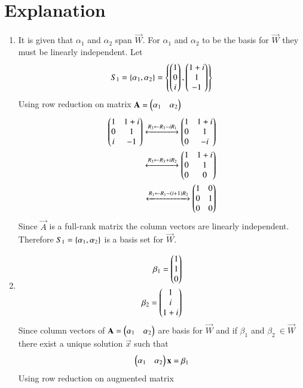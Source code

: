 \documentclass[journal,12pt,twocolumn]{IEEEtran}
\begin{document}
\section{Explanation}
\begin{enumerate}[label=\emph{\alph*)}]
\item 
It is given that $\alpha_1$ and $\alpha_2$ span $\vec{W}$. For $\alpha_1$ and
$\alpha_2$ to be the basis for $\vec{W}$ they must be linearly independent.
Let
\begin{align}
	S_1=\left\{\alpha_1,\alpha_2\right\}=\left\{\begin{pmatrix}1\\0\\i\end{pmatrix},\begin{pmatrix}1+i\\1\\-1\end{pmatrix}\right\}
\end{align}
Using row reduction on matrix $\mathbf{A}=\begin{pmatrix}\alpha_1 & \alpha_2\end{pmatrix}$
\begin{align}
	\myvec{1 & 1+i \\ 0 & 1 \\ i & -1}
	\xleftrightarrow[]{R_3 \leftarrow R_3-iR_1}
	\myvec{1 & 1+i \\ 0 & 1 \\ 0 & -i}\\   
	\xleftrightarrow[]{R_3 \leftarrow R_3+iR_2}
	\myvec{1 & 1+i \\ 0 & 1 \\ 0 & 0}\\
	\xleftrightarrow[]{R_1 \leftarrow R_1 - (i+1)R_2}
	 \myvec{1 & 0 \\ 0 & 1 \\ 0 & 0} \label{rrefA}
\end{align}
Since $\vec{A}$ is a full-rank matrix the column vectors are linearly 
independent. Therefore $S_1= \left\{ \alpha_1, \alpha_2 \right\} $ is a basis set for 
$\vec{W}$.
\item
\begin{align}
	\beta_1=\begin{pmatrix}1\\1\\0\end{pmatrix} \\
	\beta_2=\begin{pmatrix}1\\i\\1+i\end{pmatrix} 
\end{align}
		Since column vectors of $\mathbf{A}=\begin{pmatrix}\alpha_1 & \alpha_2\end{pmatrix}$ are basis for $\vec{W}$ and if $\beta_1$ and $\beta_2 \ \in \vec{W}$ there exist a unique solution $\vec{x}$ such that
\begin{align}
	\begin{pmatrix}\alpha_1 & \alpha_2\end{pmatrix}\mathbf{x}=\beta_1 
\end{align}
Using row reduction on augmented matrix

\end{enumerate}
\end{document}
